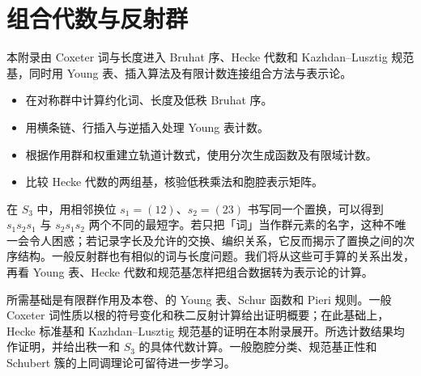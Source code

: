 
\chapter{组合代数与反射群}
\label{b5:app:A}

\begin{chapterabstract}
	本附录由 Coxeter 词与长度进入 Bruhat 序、Hecke 代数和 Kazhdan--Lusztig 规范基，同时用 Young 表、插入算法及有限计数连接组合方法与表示论。
\end{chapterabstract}
\begin{learninggoals}
	\begin{itemize}
		\item 在对称群中计算约化词、长度及低秩 Bruhat 序。
		\item 用横条链、行插入与逆插入处理 Young 表计数。
		\item 根据作用群和权重建立轨道计数式，使用分次生成函数及有限域计数。
		\item 比较 Hecke 代数的两组基，核验低秩乘法和胞腔表示矩阵。
	\end{itemize}
\end{learninggoals}

在 \(S_3\) 中，用相邻换位 \(s_1=(12)\)、\(s_2=(23)\) 书写同一个置换，可以得到 \(s_1s_2s_1\) 与 \(s_2s_1s_2\) 两个不同的最短字。若只把「词」当作群元素的名字，这种不唯一会令人困惑；若记录字长及允许的交换、编织关系，它反而揭示了置换之间的次序结构。一般反射群也有相似的词与长度问题。我们将从这些可手算的关系出发，再看 Young 表、Hecke 代数和规范基怎样把组合数据转为表示论的计算。

\ProseParagraphBreak
所需基础是有限群作用及本卷、的 Young 表、Schur 函数和 Pieri 规则。一般 Coxeter 词性质以根的符号变化和秩二反射计算给出证明概要；在此基础上，Hecke 标准基和 Kazhdan--Lusztig 规范基的证明在本附录展开。所选计数结果均作证明，并给出秩一和 \(S_3\) 的具体代数计算。一般胞腔分类、规范基正性和 Schubert 簇的上同调理论可留待进一步学习。






